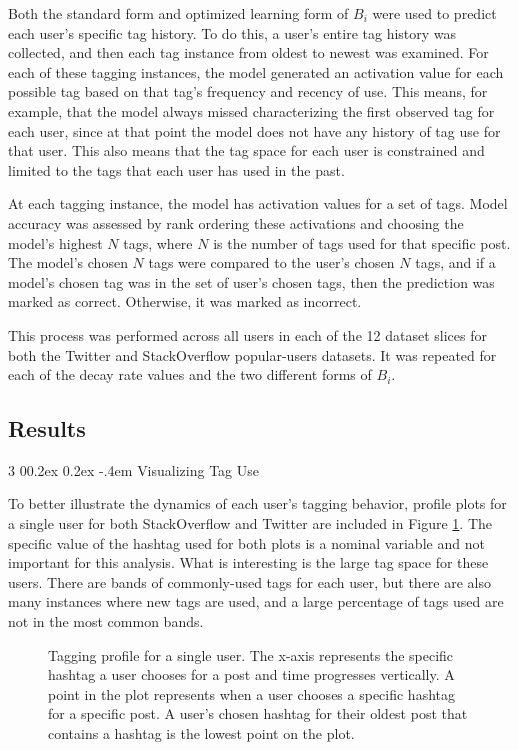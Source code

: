 \documentclass[man,floatsintext,donotrepeattitle]{apa6}
\makeatletter
\renewcommand{\subsubsection}{%
  \@startsection
  {subsubsection}%
  {3}%
  {\parindent}%
  {0\baselineskip \@plus 0.2ex \@minus 0.2ex}%
  {-.4em}%
  {\normalfont\normalsize\bfseries\addperi}}
\makeatother
\begin{document}
Both the standard form and optimized learning form of $B_{i}$ were used to predict each user's specific tag history.
To do this, a user's entire tag history was collected, and then each tag instance from oldest to newest was examined.
For each of these tagging instances, the model generated an activation value for each possible tag based on that tag's frequency and recency of use. 
This means, for example, that the model always missed characterizing the first observed tag for each user, since at that point the model does not have any history of tag use for that user.
This also means that the tag space for each user is constrained and limited to the tags that each user has used in the past.

At each tagging instance, the model has activation values for a set of tags.
Model accuracy was assessed by rank ordering these activations and choosing the model's highest $N$ tags, where $N$ is the number of tags used for that specific post.
The model's chosen $N$ tags were compared to the user's chosen $N$ tags, and if a model's chosen tag was in the set of user's chosen tags, then the prediction was marked as correct.
Otherwise, it was marked as incorrect.

This process was performed across all users in each of the 12 dataset slices for both the Twitter and StackOverflow popular-users datasets.
It was repeated for each of the decay rate values and the two different forms of $B_{i}$.

\subsection{Results}

\subsubsection{Visualizing Tag Use}

To better illustrate the dynamics of each user's tagging behavior,
profile plots for a single user for both StackOverflow and Twitter are included in Figure \ref{figPriorHTByTime}.
The specific value of the hashtag used for both plots is a nominal variable and not important for this analysis.
What is interesting is the large tag space for these users.
There are bands of commonly-used tags for each user, but there are also many instances where new tags are used, and a large percentage of tags used are not in the most common bands.

\begin{figure}[!htbp]
  {%
    \setlength{\fboxsep}{0pt}%
    \setlength{\fboxrule}{1pt}%
    \hfill
    \hfill
    \caption{
      Tagging profile for a single user.
      The x-axis represents the specific hashtag a user chooses for a post and time progresses vertically.
      A point in the plot represents when a user chooses a specific hashtag for a specific post.
      A user's chosen hashtag for their oldest post that contains a hashtag is the lowest point on the plot.
    }
    \label{figPriorHTByTime}
  }%
\end{figure}
\end{document}
